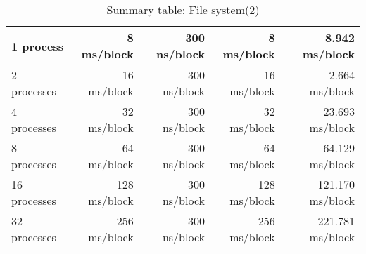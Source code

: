 \begin{table}[h]
\begin{center}
\begin{tabular}{| l | r | r | r | r |}
1 process	& 8 ms/block	& 300 ns/block       & 8 ms/block        & 8.942    ms/block \\ \hline
2 processes	& 16 ms/block	& 300 ns/block       & 16 ms/block       & 2.664    ms/block \\ \hline
4 processes	& 32 ms/block	& 300 ns/block       & 32 ms/block       & 23.693    ms/block \\ \hline
8 processes	& 64 ms/block	& 300 ns/block       & 64 ms/block       & 64.129    ms/block \\ \hline
16 processes	& 128 ms/block	& 300 ns/block       & 128 ms/block      & 121.170    ms/block \\ \hline
32 processes	& 256 ms/block	& 300 ns/block       & 256 ms/block      & 221.781    ms/block \\ \hline



\end{tabular}
\end{center}

\caption{Summary table: File system(2)}

\end{table}

